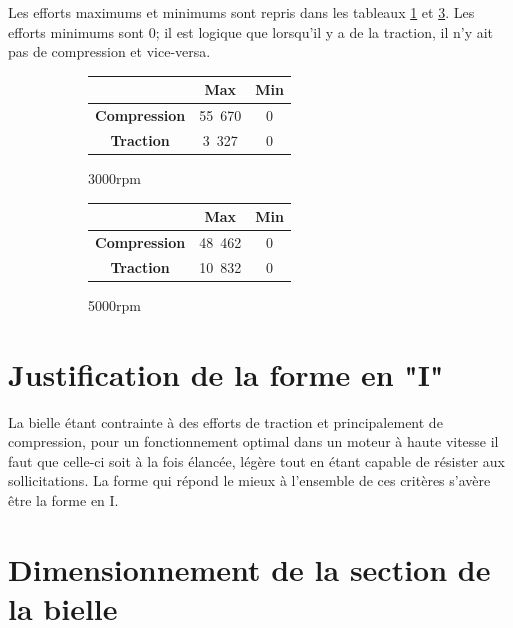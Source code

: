 \documentclass{article}
\begin{document}
Les efforts maximums et minimums sont repris dans les tableaux \ref{fig:max_3000rpm} et \ref{fig:max_5000rpm}. Les efforts minimums sont 0; il est logique que lorsqu'il y a de la traction, il n'y ait pas de compression et vice-versa.


\begin{figure}[h!]
\centering
    \begin{subfigure}[h]{0.45\textwidth}
    		\begin{tabular}{|c|c|c|}
    		\hline
    		&\textbf{Max}&\textbf{Min}\\
		\hline 
		\textbf{Compression} & \unit{55.670}{\kilo\newton} & 0\\ 
		\hline 
		\textbf{Traction} & \unit{3.327}{\kilo\newton} & 0\\ 
		\hline 
		\end{tabular} 
        \caption{\unit{3000}{rpm}}
        \label{fig:max_3000rpm}
    \end{subfigure}
    \begin{subfigure}[h]{0.45\textwidth}
        \begin{tabular}{|c|c|c|}
        \hline
    		&\textbf{Max}&\textbf{Min}\\
		\hline 
		\textbf{Compression} & \unit{48.462}{\kilo\newton}&0 \\ 
		\hline 
		\textbf{Traction} & \unit{10.832}{\kilo\newton} &0\\ 
		\hline 
		\end{tabular} 
        \caption{\unit{5000}{rpm}}
        \label{fig:max_5000rpm}
    \end{subfigure}
    \caption{}
\end{figure}



\section{Justification de la forme en "I"}
La bielle étant contrainte à des efforts de traction et principalement de compression, pour un fonctionnement optimal dans un moteur à haute vitesse il faut que celle-ci soit à la fois élancée, légère tout en étant capable de résister aux sollicitations. La forme qui répond le mieux à l'ensemble de ces critères s'avère être la forme en I.



\section{Dimensionnement de la section de la bielle}
\end{document}
